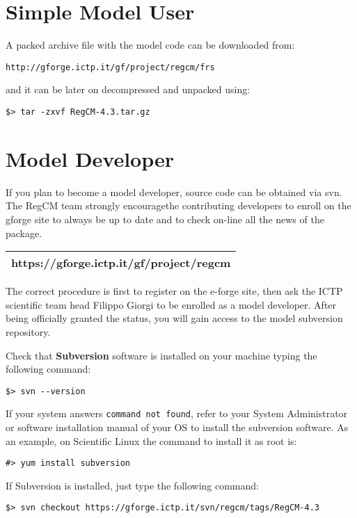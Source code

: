 %
%

\section{Simple Model User}

A packed archive file with the model code can be downloaded from:

\begin{Verbatim}
http://gforge.ictp.it/gf/project/regcm/frs
\end{Verbatim}

and it can be later on decompressed and unpacked using:

\begin{Verbatim}
$> tar -zxvf RegCM-4.3.tar.gz
\end{Verbatim}

\section{Model Developer}

If you plan to become a model developer, source code can be obtained via svn.
The RegCM team strongly encouragethe contributing developers to enroll on
the gforge site to always be up to date and to check on-line all the news of
the package.

\vspace{0.5cm}
\begin{tabular}{|c|}
\hline
{\bf https://gforge.ictp.it/gf/project/regcm} \\
\hline
\end{tabular}
\vspace{0.5cm}

The correct procedure is first to register on the e-forge site, then ask
the ICTP scientific team head Filippo Giorgi to be enrolled as a model
developer. After being officially granted the status, you will gain
access to the model subversion repository.

Check that {\bf Subversion} software is installed on your machine typing
the following command:

\begin{verbatim}
$> svn --version
\end{verbatim}

If your system answers \verb=command not found=, refer to your System
Administrator or software installation manual of your OS to install the
subversion software. As an example, on Scientific Linux the command
to install it as root is:

\begin{verbatim}
#> yum install subversion
\end{verbatim}

If Subversion is installed, just type the following command:

\begin{verbatim}
$> svn checkout https://gforge.ictp.it/svn/regcm/tags/RegCM-4.3
\end{verbatim}

